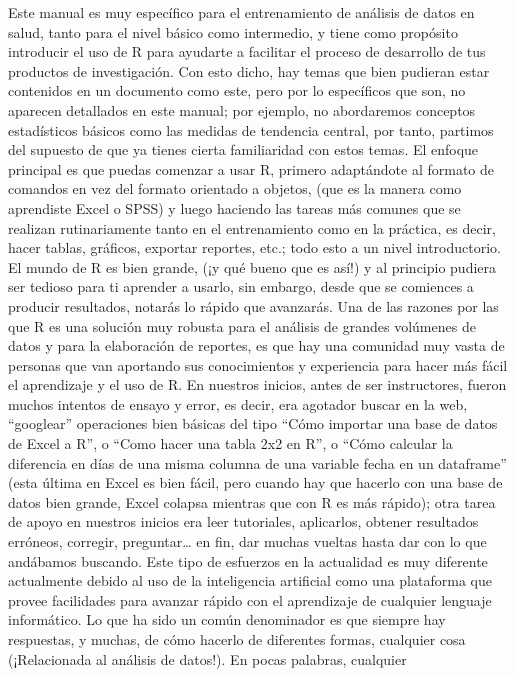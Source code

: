 \documentclass[
  letterpaper,
  DIV=11,
  numbers=noendperiod]{scrreprt}
\begin{document}
Este manual es muy específico para el entrenamiento de análisis de datos
en salud, tanto para el nivel básico como intermedio, y tiene como
propósito introducir el uso de R para ayudarte a facilitar el proceso de
desarrollo de tus productos de investigación. Con esto dicho, hay temas
que bien pudieran estar contenidos en un documento como este, pero por
lo específicos que son, no aparecen detallados en este manual; por
ejemplo, no abordaremos conceptos estadísticos básicos como las medidas
de tendencia central, por tanto, partimos del supuesto de que ya tienes
cierta familiaridad con estos temas. El enfoque principal es que puedas
comenzar a usar R, primero adaptándote al formato de comandos en vez del
formato orientado a objetos, (que es la manera como aprendiste Excel o
SPSS) y luego haciendo las tareas más comunes que se realizan
rutinariamente tanto en el entrenamiento como en la práctica, es decir,
hacer tablas, gráficos, exportar reportes, etc.; todo esto a un nivel
introductorio. El mundo de R es bien grande, (¡y qué bueno que es así!)
y al principio pudiera ser tedioso para ti aprender a usarlo, sin
embargo, desde que se comiences a producir resultados, notarás lo rápido
que avanzarás. Una de las razones por las que R es una solución muy
robusta para el análisis de grandes volúmenes de datos y para la
elaboración de reportes, es que hay una comunidad muy vasta de personas
que van aportando sus conocimientos y experiencia para hacer más fácil
el aprendizaje y el uso de R. En nuestros inicios, antes de ser
instructores, fueron muchos intentos de ensayo y error, es decir, era
agotador buscar en la web, ``googlear'' operaciones bien básicas del
tipo ``Cómo importar una base de datos de Excel a R'', o ``Como hacer
una tabla 2x2 en R'', o ``Cómo calcular la diferencia en días de una
misma columna de una variable fecha en un dataframe'' (esta última en
Excel es bien fácil, pero cuando hay que hacerlo con una base de datos
bien grande, Excel colapsa mientras que con R es más rápido); otra tarea
de apoyo en nuestros inicios era leer tutoriales, aplicarlos, obtener
resultados erróneos, corregir, preguntar\ldots{} en fin, dar muchas
vueltas hasta dar con lo que andábamos buscando. Este tipo de esfuerzos
en la actualidad es muy diferente actualmente debido al uso de la
inteligencia artificial como una plataforma que provee facilidades para
avanzar rápido con el aprendizaje de cualquier lenguaje informático. Lo
que ha sido un común denominador es que siempre hay respuestas, y
muchas, de cómo hacerlo de diferentes formas, cualquier cosa
(¡Relacionada al análisis de datos!). En pocas palabras, cualquier
\end{document}
